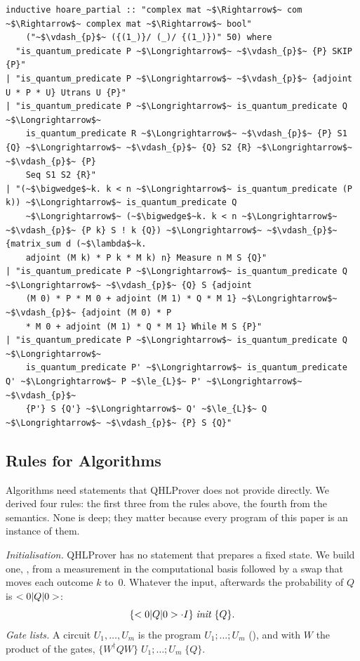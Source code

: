 \begin{lstlisting}[float=tp,caption={Ying's proof system for partial correctness, as QHLProver defines it (\isa{matrix\_sum d f n} is $\sum_{k<n}f\,k$ and $\le_L$ the L\"owner order)},label={lst:rules}]
inductive hoare_partial :: "complex mat ~$\Rightarrow$~ com ~$\Rightarrow$~ complex mat ~$\Rightarrow$~ bool"
    ("~$\vdash_{p}$~ ({(1_)}/ (_)/ {(1_)})" 50) where
  "is_quantum_predicate P ~$\Longrightarrow$~ ~$\vdash_{p}$~ {P} SKIP {P}"
| "is_quantum_predicate P ~$\Longrightarrow$~ ~$\vdash_{p}$~ {adjoint U * P * U} Utrans U {P}"
| "is_quantum_predicate P ~$\Longrightarrow$~ is_quantum_predicate Q ~$\Longrightarrow$~
    is_quantum_predicate R ~$\Longrightarrow$~ ~$\vdash_{p}$~ {P} S1 {Q} ~$\Longrightarrow$~ ~$\vdash_{p}$~ {Q} S2 {R} ~$\Longrightarrow$~ ~$\vdash_{p}$~ {P}
    Seq S1 S2 {R}"
| "(~$\bigwedge$~k. k < n ~$\Longrightarrow$~ is_quantum_predicate (P k)) ~$\Longrightarrow$~ is_quantum_predicate Q
    ~$\Longrightarrow$~ (~$\bigwedge$~k. k < n ~$\Longrightarrow$~ ~$\vdash_{p}$~ {P k} S ! k {Q}) ~$\Longrightarrow$~ ~$\vdash_{p}$~ {matrix_sum d (~$\lambda$~k.
    adjoint (M k) * P k * M k) n} Measure n M S {Q}"
| "is_quantum_predicate P ~$\Longrightarrow$~ is_quantum_predicate Q ~$\Longrightarrow$~ ~$\vdash_{p}$~ {Q} S {adjoint
    (M 0) * P * M 0 + adjoint (M 1) * Q * M 1} ~$\Longrightarrow$~ ~$\vdash_{p}$~ {adjoint (M 0) * P
    * M 0 + adjoint (M 1) * Q * M 1} While M S {P}"
| "is_quantum_predicate P ~$\Longrightarrow$~ is_quantum_predicate Q ~$\Longrightarrow$~
    is_quantum_predicate P' ~$\Longrightarrow$~ is_quantum_predicate Q' ~$\Longrightarrow$~ P ~$\le_{L}$~ P' ~$\Longrightarrow$~ ~$\vdash_{p}$~
    {P'} S {Q'} ~$\Longrightarrow$~ Q' ~$\le_{L}$~ Q ~$\Longrightarrow$~ ~$\vdash_{p}$~ {P} S {Q}"
\end{lstlisting}

\subsection{Rules for Algorithms}\label{sec:qhl-derived}

Algorithms need statements that QHLProver does not provide directly. We derived four rules: the first
three from the rules above, the fourth from the semantics. None is deep; they matter because every
program of this paper is an instance of them.

\emph{Initialisation.} QHLProver has no statement that prepares a fixed state. We build one,
, from a measurement in the computational basis followed by a swap that moves each
outcome $k$ to~$0$. Whatever the input, afterwards the probability of $Q$ is $< 0|Q|0>$:
\[
\{< 0|Q|0>\cdot I\}\;\mathit{init}\;\{Q\}.
\]
\emph{Gate lists.} A circuit $U_1,\dots,U_m$ is the program $U_1;\dots;U_m$ (), and
with $W$ the product of the gates, $\{W^\dagger QW\}\;U_1;\dots;U_m\;\{Q\}$.


